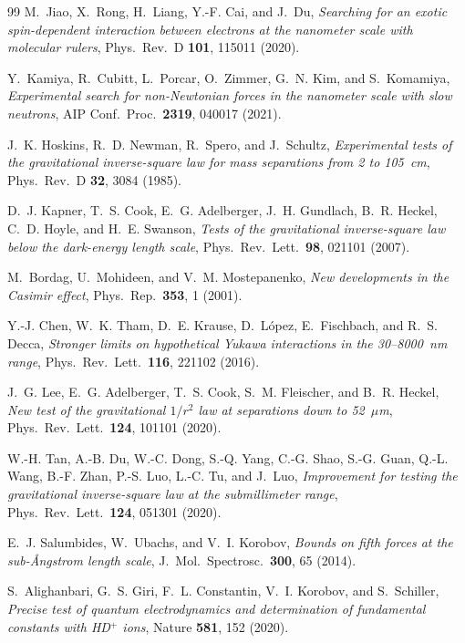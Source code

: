 \documentclass[12pt,a4paper]{report}
\begin{document}
\begin{thebibliography}{99}
M.~Jiao, X.~Rong, H.~Liang, Y.-F. Cai, and J.~Du,
\textit{Searching for an exotic spin-dependent interaction between
electrons at the nanometer scale with molecular rulers},
Phys.\ Rev.\ D \textbf{101}, 115011 (2020).

Y.~Kamiya, R.~Cubitt, L.~Porcar, O.~Zimmer, G.~N. Kim, and S.~Komamiya,
\textit{Experimental search for non-Newtonian forces in the nanometer
scale with slow neutrons},
AIP Conf.\ Proc.\ \textbf{2319}, 040017 (2021).

J.~K. Hoskins, R.~D. Newman, R.~Spero, and J.~Schultz,
\textit{Experimental tests of the gravitational inverse-square law for
mass separations from 2 to 105~cm},
Phys.\ Rev.\ D \textbf{32}, 3084 (1985).

D.~J. Kapner, T.~S. Cook, E.~G. Adelberger, J.~H. Gundlach, B.~R. Heckel,
C.~D. Hoyle, and H.~E. Swanson,
\textit{Tests of the gravitational inverse-square law below the
dark-energy length scale},
Phys.\ Rev.\ Lett.\ \textbf{98}, 021101 (2007).

M.~Bordag, U.~Mohideen, and V.~M. Mostepanenko,
\textit{New developments in the Casimir effect},
Phys.\ Rep.\ \textbf{353}, 1 (2001).

Y.-J. Chen, W.~K. Tham, D.~E. Krause, D.~L\'{o}pez, E.~Fischbach, and
R.~S. Decca,
\textit{Stronger limits on hypothetical Yukawa interactions in the
30--8000~nm range},
Phys.\ Rev.\ Lett.\ \textbf{116}, 221102 (2016).

J.~G. Lee, E.~G. Adelberger, T.~S. Cook, S.~M. Fleischer, and B.~R. Heckel,
\textit{New test of the gravitational $1/r^2$ law at separations down to
52~$\mu$m},
Phys.\ Rev.\ Lett.\ \textbf{124}, 101101 (2020).

W.-H. Tan, A.-B. Du, W.-C. Dong, S.-Q. Yang, C.-G. Shao, S.-G. Guan,
Q.-L. Wang, B.-F. Zhan, P.-S. Luo, L.-C. Tu, and J.~Luo,
\textit{Improvement for testing the gravitational inverse-square law at
the submillimeter range},
Phys.\ Rev.\ Lett.\ \textbf{124}, 051301 (2020).

E.~J. Salumbides, W.~Ubachs, and V.~I. Korobov,
\textit{Bounds on fifth forces at the sub-\AA ngstrom length scale},
J.\ Mol.\ Spectrosc.\ \textbf{300}, 65 (2014).

S.~Alighanbari, G.~S. Giri, F.~L. Constantin, V.~I. Korobov, and
S.~Schiller,
\textit{Precise test of quantum electrodynamics and determination of
fundamental constants with HD$^+$ ions},
Nature \textbf{581}, 152 (2020).


\end{thebibliography}
\end{document}
